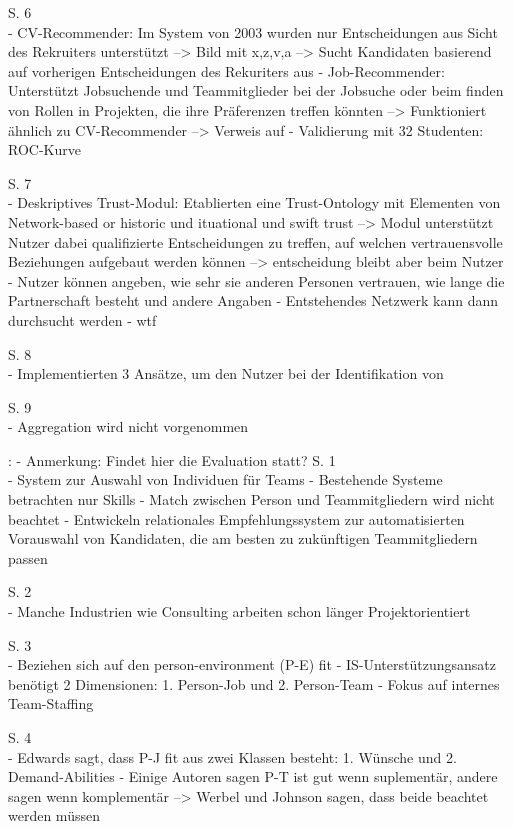 S. 6\\
- CV-Recommender: Im System von 2003 wurden nur Entscheidungen aus Sicht des Rekruiters unterstützt --> Bild mit x,z,v,a --> Sucht Kandidaten basierend auf vorherigen Entscheidungen des Rekuriters aus
- Job-Recommender: Unterstützt Jobsuchende und Teammitglieder bei der Jobsuche oder beim finden von Rollen in Projekten, die ihre Präferenzen treffen könnten --> Funktioniert ähnlich zu CV-Recommender --> Verweis auf \textcite{malinowski:2006}
- Validierung mit 32 Studenten: ROC-Kurve

S. 7\\
- Deskriptives Trust-Modul: Etablierten eine Trust-Ontology mit Elementen von Network-based or historic und ituational und swift trust --> Modul unterstützt Nutzer dabei qualifizierte Entscheidungen zu treffen, auf welchen vertrauensvolle Beziehungen aufgebaut werden können --> entscheidung bleibt aber beim Nutzer
- Nutzer können angeben, wie sehr sie anderen Personen vertrauen, wie lange die Partnerschaft besteht und andere Angaben
- Entstehendes Netzwerk kann dann durchsucht werden
- wtf

S. 8\\
- Implementierten 3 Ansätze, um den Nutzer bei der Identifikation von 

S. 9\\
- Aggregation wird nicht vorgenommen

\textcite{malinowski:2008}:
- Anmerkung: Findet hier die Evaluation statt?
S. 1\\
- System zur Auswahl von Individuen für Teams
- Bestehende Systeme betrachten nur Skills - Match zwischen Person und Teammitgliedern wird nicht beachtet
- Entwickeln relationales Empfehlungssystem zur automatisierten Vorauswahl von Kandidaten, die am besten zu zukünftigen Teammitgliedern passen

S. 2\\
- Manche Industrien wie Consulting arbeiten schon länger Projektorientiert

S. 3\\
- Beziehen sich auf den person-environment (P-E) fit
- IS-Unterstützungsansatz benötigt 2 Dimensionen: 1. Person-Job und 2. Person-Team
- Fokus auf internes Team-Staffing

S. 4\\
- Edwards sagt, dass P-J fit aus zwei Klassen besteht: 1. Wünsche und 2. Demand-Abilities
- Einige Autoren sagen P-T ist gut wenn suplementär, andere sagen wenn komplementär --> Werbel und Johnson sagen, dass beide beachtet werden müssen

